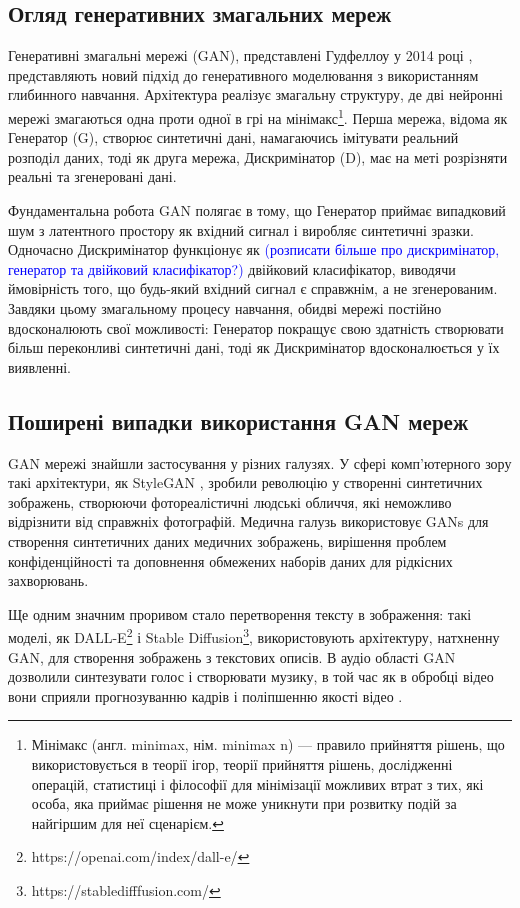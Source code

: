 \subsection{Огляд генеративних змагальних мереж}
Генеративні змагальні мережі (GAN), представлені Гудфеллоу у 2014 році \cite{Goodfellow GANs NIPS}, представляють новий підхід до генеративного моделювання з використанням глибинного навчання. Архітектура реалізує змагальну структуру, де дві нейронні мережі змагаються одна проти одної в грі на мінімакс\footnote{Мінімакс (англ. minimax, нім. minimax n) — правило прийняття рішень, що використовується в теорії ігор, теорії прийняття рішень, дослідженні операцій, статистиці і філософії для мінімізації можливих втрат з тих, які особа, яка приймає рішення не може уникнути при розвитку подій за найгіршим для неї сценарієм.\cite{minimax wiki}}. Перша мережа, відома як Генератор (G), створює синтетичні дані, намагаючись імітувати реальний розподіл даних, тоді як друга мережа, Дискримінатор (D), має на меті розрізняти реальні та згенеровані дані.

Фундаментальна робота GAN полягає в тому, що Генератор приймає випадковий шум з латентного простору як вхідний сигнал і виробляє синтетичні зразки. Одночасно Дискримінатор функціонує як \textcolor{blue}{(розписати більше про дискримінатор, генератор та двійковий класифікатор?)} двійковий класифікатор, виводячи ймовірність того, що будь-який вхідний сигнал є справжнім, а не згенерованим. Завдяки цьому змагальному процесу навчання, обидві мережі постійно вдосконалюють свої можливості: Генератор покращує свою здатність створювати більш переконливі синтетичні дані, тоді як Дискримінатор вдосконалюється у їх виявленні.

\subsection{Поширені випадки використання GAN мереж}
GAN мережі знайшли застосування у різних галузях. У сфері комп'ютерного зору такі архітектури, як StyleGAN \cite{StyleGAN}, зробили революцію у створенні синтетичних зображень, створюючи фотореалістичні людські обличчя, які неможливо відрізнити від справжніх фотографій. Медична галузь використовує GANs для створення синтетичних даних медичних зображень, вирішення проблем конфіденційності та доповнення обмежених наборів даних для рідкісних захворювань.

Ще одним значним проривом стало перетворення тексту в зображення: такі моделі, як DALL-E\footnote{https://openai.com/index/dall-e/} і Stable Diffusion\footnote{https://stabledifffusion.com/}, використовують архітектуру, натхненну GAN, для створення зображень з текстових описів. В аудіо області GAN дозволили синтезувати голос і створювати музику, в той час як в обробці відео вони сприяли прогнозуванню кадрів і поліпшенню якості відео \cite{Video to video synthesis}.


